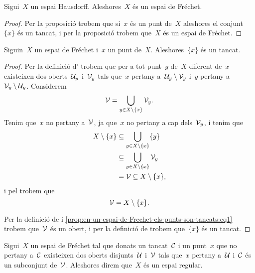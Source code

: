 \documentclass[../../main.tex]{subfiles}
\begin{document}
    \begin{corollary}
        \label{cor:els-espais-Hausdorff-son-Frechet}
        Sigui~\(X\) un espai Hausdorff.
        Aleshores~\(X\) és un espai de Fréchet.
    \end{corollary}
    \begin{proof}
        Per la proposició  trobem que si~\(x\) és un punt de~\(X\) aleshores el conjunt~\(\{x\}\) és un tancat, i per la proposició  trobem que~\(X\) és un espai de Fréchet.
    \end{proof}
    \begin{proposition}
        \label{prop:en-un-espai-de-Frechet-els-punts-son-tancats}
        Siguin~\(X\) un espai de Fréchet i~\(x\) un punt de~\(X\).
        Aleshores~\(\{x\}\) és un tancat.
    \end{proposition}
    \begin{proof}
        Per la definició d' trobem que per a tot punt~\(y\) de~\(X\) diferent de~\(x\) existeixen dos oberts~\(\mathcal{U}_{y}\) i~\(\mathcal{V}_{y}\) tals que~\(x\) pertany a~\(\mathcal{U}_{y}\setminus\mathcal{V}_{y}\) i~\(y\) pertany a~\(\mathcal{V}_{y}\setminus\mathcal{U}_{y}\).
        Considerem
        \begin{equation}
            \label{prop:en-un-espai-de-Frechet-els-punts-son-tancats:eq1}
            \mathcal{V}=\bigcup_{y\in X\setminus\{x\}}\mathcal{V}_{y}.
        \end{equation}
        Tenim que~\(x\) no pertany a~\(\mathcal{V}\), ja que~\(x\) no pertany a cap dels~\(\mathcal{V}_{y}\), i tenim que
        \begin{align*}
            X\setminus\{x\}&\subseteq\bigcup_{y\in X\setminus\{x\}}\{y\} \\
            &\subseteq\bigcup_{y\in X\setminus\{x\}}\mathcal{V}_{y}\\
            &=\mathcal{V}\subseteq X\setminus\{x\},
        \end{align*}
        i pel  trobem que
        \[
            \mathcal{V}=X\setminus\{x\}.
        \]

        Per la definició de  i \eqref{prop:en-un-espai-de-Frechet-els-punts-son-tancats:eq1} trobem que~\(\mathcal{V}\) és un obert, i per la definició de   trobem que~\(\{x\}\) és un tancat.
    \end{proof}
    \begin{definition}
        \label{def:espai-regular}
        Sigui~\(X\) un espai de Fréchet tal que donats un tancat~\(\mathcal{C}\) i un punt~\(x\) que no pertany a~\(\mathcal{C}\) existeixen dos oberts disjunts~\(\mathcal{U}\) i~\(\mathcal{V}\) tals que~\(x\) pertany a~\(\mathcal{U}\) i~\(\mathcal{C}\) és un subconjunt de~\(\mathcal{V}\).
        Aleshores direm que~\(X\) és un espai regular.
    \end{definition}
\end{document}
